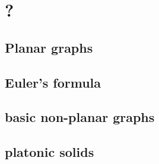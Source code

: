\documentclass[main]{subfiles}
\begin{document}

\section{?}
\subsection{Planar graphs}
\subsection{Euler's formula}
\subsection{basic non-planar graphs}
\subsection{platonic solids}
\end{document}
